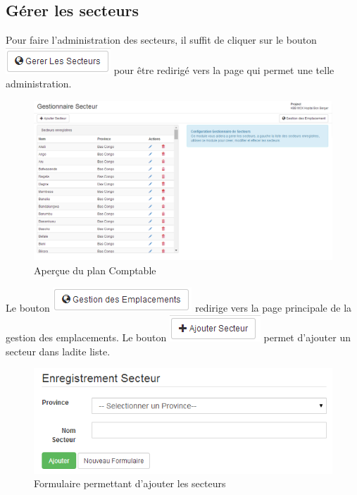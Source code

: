\documentclass[12pt,a4paper]{report}
\begin{document}
\subsection{Gérer les secteurs}
Pour faire l'administration des secteurs, il suffit de cliquer sur le bouton \includegraphics[scale=0.7]{pic/AdminSecteur.png} pour être redirigé vers la page qui permet une telle administration.

\begin{figure}[h]
\begin{center}
\includegraphics[width=14cm]{pic/FormulaireGestionSecteur.png}
\end{center}
\caption{Aperçue du plan Comptable}
\label{Aperçue du plan Comptable}
\end{figure}

Le bouton \includegraphics[scale=0.7]{pic/GestionEmplacement.png} redirige vers la page principale de la gestion des emplacements.
Le bouton \includegraphics[scale=0.7]{pic/AddSecteur.png} permet d'ajouter un secteur dans ladite liste.

\begin{figure}[h]
\begin{center}
\includegraphics[width=14cm]{pic/FormAddSecteur.png}
\end{center}
\caption{Formulaire permettant d'ajouter les secteurs}
\label{Formulaire permettant d'ajouter les secteurs}
\end{figure}
\end{document}
